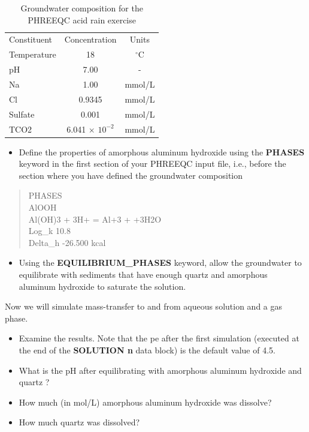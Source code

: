 \begin{table}[b]
\caption{Groundwater composition for the PHREEQC acid rain exercise}
\begin{center}
\begin{tabular}{l c c }
\hline
Constituent	& Concentration	& Units     \\
Temperature	& 18	          & $^\circ$C \\
pH	        & 7.00          & 	-       \\
Na	        & 1.00	        &   mmol/L  \\
Cl	        & 0.9345	      &   mmol/L  \\
Sulfate	    & 0.001	        &   mmol/L  \\
TCO2	      & 6.041 $\times$ $10^{-2}$    &   mmol/L  \\ \hline
\end{tabular}
\label{phc_ex_acid_rain}
\end{center}
\end{table}

\begin{itemize}
\item Define the properties of amorphous aluminum hydroxide using the {\color{red} \textbf{PHASES}} 
keyword in the first section of your PHREEQC input file, i.e., before 
the section where you have defined the groundwater composition

\end{itemize}

\begin{quote}
{\color{red}PHASES \\
AlOOH \\
Al(OH)3  +  3H+  =  Al+3  +  +3H2O \\
Log\_k	10.8 \\
Delta\_h	-26.500 kcal }\\
\end{quote}

\begin{itemize}
\item Using the {\color{red}\textbf{EQUILIBRIUM\_PHASES}} keyword, 
allow the groundwater to equilibrate with sediments that have enough quartz 
and amorphous aluminum hydroxide to saturate the solution.
\end{itemize}

Now we will simulate mass-transfer to and from aqueous solution and a gas phase.

\begin{itemize}
\item Examine the results. Note that the pe after the first simulation 
(executed at the end of the {\color{red}\textbf{SOLUTION n}} data block) is the default value of 4.5.
\item What is the pH after equilibrating with amorphous aluminum hydroxide and quartz ?  
\item How much (in mol/L) amorphous aluminum hydroxide was dissolve?
\item How much quartz was dissolved?

\end{itemize}

